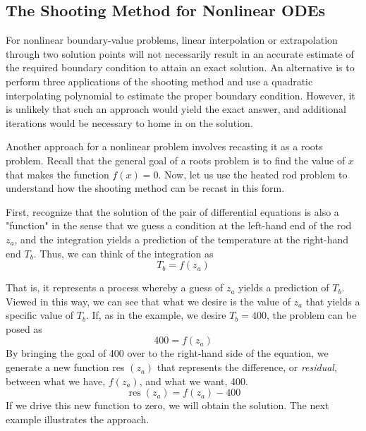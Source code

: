 \documentclass[../main.tex]{subfiles}
\begin{document}
\subsection{The Shooting Method for Nonlinear ODEs}

\noindent For nonlinear boundary-value problems, linear interpolation or extrapolation through two solution points will not necessarily result in an accurate estimate of the required boundary condition to attain an exact solution. An alternative is to perform three applications of the shooting method and use a quadratic interpolating polynomial to estimate the proper boundary condition.
However, it is unlikely that such an approach would yield the exact answer, and additional iterations would be necessary to home in on the solution.

Another approach for a nonlinear problem involves recasting it as a roots problem. Recall that the general goal of a roots problem is to find the value of $x$ that makes the function $f(x)=0$. Now, let us use the heated rod problem to understand how the shooting method can be recast in this form.

First, recognize that the solution of the pair of differential equations is also a "function" in the sense that we guess a condition at the left-hand end of the rod $z_{a}$, and the integration yields a prediction of the temperature at the right-hand end $T_{b}$. Thus, we can think of the integration as
$$
T_{b}=f\left(z_{a}\right)
$$

\noindent That is, it represents a process whereby a guess of $z_{a}$ yields a prediction of $T_{b}$. Viewed in this way, we can see that what we desire is the value of $z_{a}$ that yields a specific value of $T_{b}$. If, as in the example, we desire $T_{b}=400$, the problem can be posed as
$$
400=f\left(z_{a}\right)
$$
By bringing the goal of 400 over to the right-hand side of the equation, we generate a new function res $\left(z_{a}\right)$ that represents the difference, or \textit{residual}, between what we have, $f\left(z_{a}\right)$, and what we want, 400.
$$
\operatorname{res}\left(z_{a}\right)=f\left(z_{a}\right)-400
$$
If we drive this new function to zero, we will obtain the solution. The next example illustrates the approach.
\end{document}
